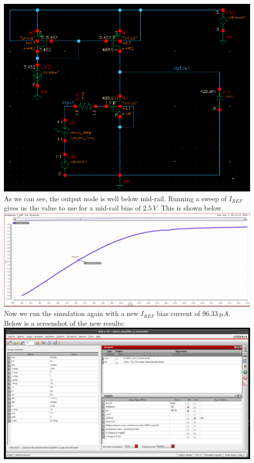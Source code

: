 \documentclass[12pt, fleqn]{article}
\begin{document}
\includegraphics[scale=0.4, center]{d_dc_voltage.png}\\[0.25cm]
As we can see, the output node is well below mid-rail.  Running a sweep of $I_{REF}$ gives us the value to use for a mid-rail bias of $2.5\,V$.  This is shown below.\\[0.1cm]
\includegraphics[scale=0.25, center]{d_dc_sweep.png}
\newpage\noindent
Now we run the simulation again with a new $I_{REF}$ bias current of $96.33\,\mu A$.  Below is a screenshot of the new results:\\[0.1cm]
\includegraphics[scale=0.35, center]{d_gain_bw_new.png}\\[0.25cm]
\end{document}
